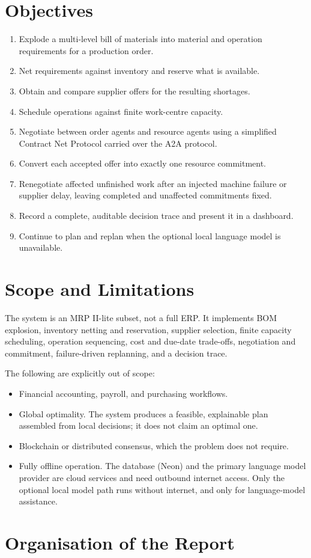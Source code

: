 \section{Objectives}

\begin{enumerate}[nosep]
  \item Explode a multi-level bill of materials into material and operation
        requirements for a production order.
  \item Net requirements against inventory and reserve what is available.
  \item Obtain and compare supplier offers for the resulting shortages.
  \item Schedule operations against finite work-centre capacity.
  \item Negotiate between order agents and resource agents using a simplified
        Contract Net Protocol carried over the A2A protocol.
  \item Convert each accepted offer into exactly one resource commitment.
  \item Renegotiate affected unfinished work after an injected machine failure
        or supplier delay, leaving completed and unaffected commitments fixed.
  \item Record a complete, auditable decision trace and present it in a
        dashboard.
  \item Continue to plan and replan when the optional local language model is
        unavailable.
\end{enumerate}

\section{Scope and Limitations}

The system is an MRP II-lite subset, not a full ERP. It implements BOM
explosion, inventory netting and reservation, supplier selection, finite
capacity scheduling, operation sequencing, cost and due-date trade-offs,
negotiation and commitment, failure-driven replanning, and a decision trace.

The following are explicitly out of scope:

\begin{itemize}[nosep]
  \item Financial accounting, payroll, and purchasing workflows.
  \item Global optimality. The system produces a feasible, explainable plan
        assembled from local decisions; it does not claim an optimal one.
  \item Blockchain or distributed consensus, which the problem does not
        require.
  \item Fully offline operation. The database (Neon) and the primary language
        model provider are cloud services and need outbound internet access.
        Only the optional local model path runs without internet, and only for
        language-model assistance.
\end{itemize}

\section{Organisation of the Report}

